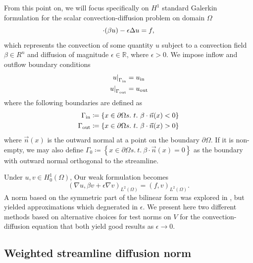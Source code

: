 \documentclass[final,leqno]{siamltex}
\newcommand{\LRp}[1]{\left( #1 \right)}
\newcommand{\LRc}[1]{\left\{ #1 \right\}}
\newcommand{\Grad} {\ensuremath{\nabla}}
\renewcommand{\L}{L^2\LRp{\Omega}}
\newcommand{\del}{\Delta}
\let\grad\relax
\newcommand{\grad}{\nabla}
\renewcommand{\div}{\grad \cdot}
\begin{document}
From this point on, we will focus specifically on $H^1$ standard Galerkin formulation for the scalar convection-diffusion problem on domain $\Omega$
\[
\div(\beta u) - \epsilon \del u = f,
\]
which represents the convection of some quantity $u$ subject to a convection field $\beta \in R^n$ and diffusion of magnitude $\epsilon \in \mathbb{R}$, where $\epsilon > 0$.  We impose inflow and outflow boundary conditions
\begin{align*}
\left.u\right|_{\Gamma_{\rm in}} &= u_{\rm in}\\
\left.u\right|_{\Gamma_{\rm out}} &= u_{\rm out}
\end{align*}
where the following boundaries are defined as 
\begin{align*}
\Gamma_{\rm in}\coloneqq \LRc{x\in \partial \Omega s.\ t.\ \beta\cdot\vec{n}(x) < 0}\\
\Gamma_{\rm out}\coloneqq \LRc{x\in \partial \Omega s.\ t.\ \beta\cdot\vec{n}(x) > 0}
\end{align*}
where $\vec{n}(x)$ is the outward normal at a point on the boundary $\partial \Omega$.  If it is non-empty, we may also define $\Gamma_{0}\coloneqq \LRc{x\in \partial \Omega s.\ t.\ \beta\cdot\vec{n}(x) = 0}$ as the boundary with outward normal orthogonal to the streamline.  

Under $u,v \in H^1_0(\Omega)$, Our weak formulation becomes
\[
\LRp{\Grad u,\beta v + \epsilon \Grad v}_{\L} = \LRp{f,v}_{\L}.
\]
A norm based on the symmetric part of the bilinear form was explored in \cite{DahmenVariationalStabilization}, but yielded approximations which degnerated in $\epsilon$.  We present here two different methods based on alternative choices for test norms on $V$ for the convection-diffusion equation that both yield good results as $\epsilon\rightarrow 0$.  

\subsection{Weighted streamline diffusion norm}
\end{document}
